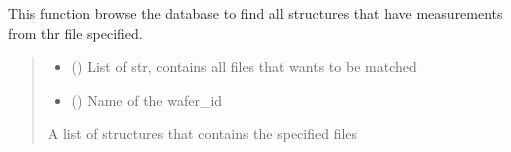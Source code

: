 \documentclass[letterpaper,10pt,english]{sphinxmanual}
\begin{document}
\begin{fulllineitems}
\label{\detokenize{filter:filter.filter_by_filename}}
\pysigstartsignatures
{}
\pysigstopsignatures
\sphinxAtStartPar
This function browse the database to find all structures that have measurements from thr file specified.
\begin{quote}\begin{description}
\begin{itemize}
\item {} 
\sphinxAtStartPar
{} () \textendash{} List of str, contains all files that wants to be matched

\item {} 
\sphinxAtStartPar
{} () \textendash{} Name of the wafer\_id

\end{itemize}

\sphinxAtStartPar
A list of structures that contains the specified files

\end{description}\end{quote}

\end{fulllineitems}

\end{document}
